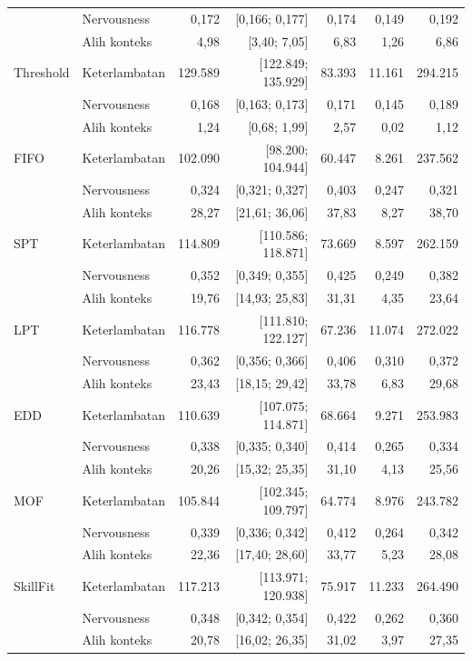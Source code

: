 \begin{table}[htbp]
\begin{tabular}{llrrrrr}
 & Nervousness & 0,172 & [0,166; 0,177] & 0,174 & 0,149 & 0,192 \\
 & Alih konteks & 4,98 & [3,40; 7,05] & 6,83 & 1,26 & 6,86 \\
\addlinespace
Threshold & Keterlambatan & 129.589 & [122.849; 135.929] & 83.393 & 11.161 & 294.215 \\
 & Nervousness & 0,168 & [0,163; 0,173] & 0,171 & 0,145 & 0,189 \\
 & Alih konteks & 1,24 & [0,68; 1,99] & 2,57 & 0,02 & 1,12 \\
\addlinespace
FIFO & Keterlambatan & 102.090 & [98.200; 104.944] & 60.447 & 8.261 & 237.562 \\
 & Nervousness & 0,324 & [0,321; 0,327] & 0,403 & 0,247 & 0,321 \\
 & Alih konteks & 28,27 & [21,61; 36,06] & 37,83 & 8,27 & 38,70 \\
\addlinespace
SPT & Keterlambatan & 114.809 & [110.586; 118.871] & 73.669 & 8.597 & 262.159 \\
 & Nervousness & 0,352 & [0,349; 0,355] & 0,425 & 0,249 & 0,382 \\
 & Alih konteks & 19,76 & [14,93; 25,83] & 31,31 & 4,35 & 23,64 \\
\addlinespace
LPT & Keterlambatan & 116.778 & [111.810; 122.127] & 67.236 & 11.074 & 272.022 \\
 & Nervousness & 0,362 & [0,356; 0,366] & 0,406 & 0,310 & 0,372 \\
 & Alih konteks & 23,43 & [18,15; 29,42] & 33,78 & 6,83 & 29,68 \\
\addlinespace
EDD & Keterlambatan & 110.639 & [107.075; 114.871] & 68.664 & 9.271 & 253.983 \\
 & Nervousness & 0,338 & [0,335; 0,340] & 0,414 & 0,265 & 0,334 \\
 & Alih konteks & 20,26 & [15,32; 25,35] & 31,10 & 4,13 & 25,56 \\
\addlinespace
MOF & Keterlambatan & 105.844 & [102.345; 109.797] & 64.774 & 8.976 & 243.782 \\
 & Nervousness & 0,339 & [0,336; 0,342] & 0,412 & 0,264 & 0,342 \\
 & Alih konteks & 22,36 & [17,40; 28,60] & 33,77 & 5,23 & 28,08 \\
\addlinespace
SkillFit & Keterlambatan & 117.213 & [113.971; 120.938] & 75.917 & 11.233 & 264.490 \\
 & Nervousness & 0,348 & [0,342; 0,354] & 0,422 & 0,262 & 0,360 \\
 & Alih konteks & 20,78 & [16,02; 26,35] & 31,02 & 3,97 & 27,35 \\

\end{tabular}
\end{table}
